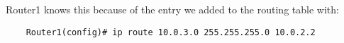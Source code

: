 Router1 knows this because of the entry we added to the routing table with:
\begin{lstlisting}
	Router1(config)# ip route 10.0.3.0 255.255.255.0 10.0.2.2
\end{lstlisting}